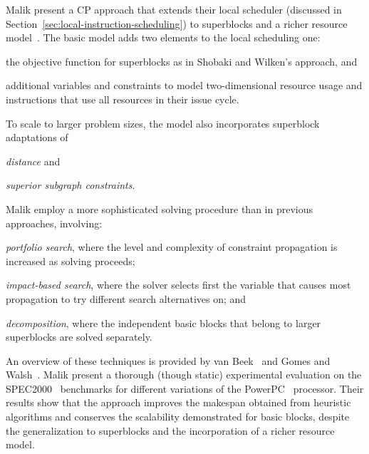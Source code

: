 \documentclass[acmsmall,authorversion,nonacm]{acmart}
\begin{document}
Malik \etal{} present a CP approach that extends their local scheduler
(discussed in Section~\ref{sec:local-instruction-scheduling}) to
superblocks and a richer resource model~\cite{Malik2008b}.
The basic model adds two elements to the local scheduling one:
\begin{inparaitem}[]
\item the objective function for superblocks as in Shobaki and
  Wilken's approach, and
\item additional variables and constraints to model two-dimensional
  resource usage and instructions that use all resources in their
  issue cycle.
\end{inparaitem}
To scale to larger problem sizes, the model also incorporates
superblock adaptations of
\begin{inparaitem}[]
\item \emph{distance} and
\item \emph{superior subgraph constraints}.
\end{inparaitem}
Malik \etal{} employ a more sophisticated solving procedure than in
previous approaches, involving:
\begin{inparaitem}[]
\item \emph{portfolio search}, where the level and complexity of
  constraint propagation is increased as solving proceeds;
\item \emph{impact-based search}, where the solver selects first the
  variable that causes most propagation to try different search
  alternatives on; and
\item \emph{decomposition}, where the independent basic blocks that
  belong to larger superblocks are solved separately.
\end{inparaitem}
An overview of these techniques is provided by van
Beek~\cite{CPH:search} and Gomes and Walsh~\cite{CPH:random}.
Malik \etal{} present a thorough (though static) experimental
evaluation on the SPEC2000~\cite{CPU} benchmarks for different
variations of the PowerPC~\cite{Diefendorff1994} processor.
Their results show that the approach improves the makespan obtained
from heuristic algorithms and conserves the scalability demonstrated
for basic blocks, despite the generalization to superblocks and the
incorporation of a richer resource model.
\end{document}
